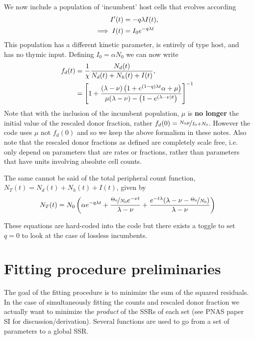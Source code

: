 \documentclass{tufte-book} %
\begin{document}
We now include a population of `incumbent' host cells that evolves according
\begin{align}
I'(t)& = -q \lambda I(t), \notag{} \\
\implies I(t)& = I_0 e^{-q\lambda t}
\end{align}
This population has a different kinetic parameter, is entirely of type host, and has no thymic input. Defining $I_0 = \alpha N_0$ we can now write
\begin{align}
f_d(t)&=\frac{1}{\chi}\frac{N_d(t)}{N_d(t)+N_h(t)+I(t)},\notag{} \\
& =  \left[1+\frac{(\lambda-\nu)\left(1+e^{(1-q)\lambda t}\alpha+\mu\right)}{\mu (\lambda-\nu)-\left(1-e^{(\lambda-\nu)t}\right)}\right]^{-1}
\end{align}
\index{$\mu$}Note that with the inclusion of the incumbent population, $\mu$ is \textbf{no longer} the initial value of the rescaled donor fraction, rather $f_d(0) = \nicefrac{N_0 \mu}{I_0+N_0}$. However the code uses $\mu$ not $f_d(0)$ and so we keep the above formalism in these notes. Also note that the rescaled donor fractions as defined are completely scale free, i.e. only depend on parameters that are rates or fractions, rather than parameters that have units involving absolute cell counts. 

The same cannot be said of the total peripheral count function, $N_T(t) = N_d(t) +N_h(t)+I(t)$, given by
\begin{equation}
N_T(t) = N_0 \left(\alpha  e^{  -q \lambda t}+\frac{\nicefrac{\Theta_0}{N_0} e^{-\nu t}}{\lambda -\nu }+\frac{e^{  -t \lambda} ( \lambda -\nu -\nicefrac{\Theta_0}{N_0})}{\lambda -\nu }\right)
\end{equation}

These equations are hard-coded into the code but there exists a toggle to set $q=0$ to look at the case of lossless incumbents. 
\section{Fitting procedure preliminaries}
The  goal of the fitting procedure is to minimize the sum of the squared residuals. In the case of simultaneously fitting the counts and rescaled donor fraction we actually want to minimize the \textit{product} of the SSRs of each set (see PNAS paper SI for discussion/derivation). Several functions are used to go from a set of parameters to a global SSR.
\end{document}
